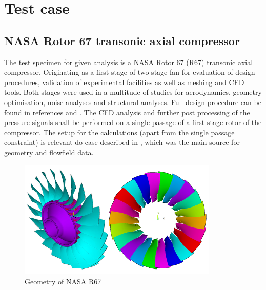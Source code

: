 
\chapter{Test case} %

\label{case} %


\section{NASA Rotor 67 transonic axial compressor}

The test specimen for given analysis is a NASA Rotor 67 (R67) transonic axial compressor. Originating as a first stage of two stage fan for evaluation of design procedures, validation of experimental facilities as well as meshing and CFD tools. Both stages were used in a multitude of studies for aerodynamics, geometry optimisation, noise analyses and structural analyses. Full design procedure can be found in references \cite{r67design} and \citep{r67performance}. The CFD analysis and further post processing of the pressure signals shall be performed on a single passage of a first stage rotor of the compressor. The setup for the  calculations (apart from the single passage constraint) is relevant do case described in \citep{r67laser}, which was the main source for geometry and flowfield data.

\begin{figure}[h!]
\centering %
\includegraphics[width=0.85\textwidth]{Pictures/r67_over.png}
\caption{Geometry of NASA R67}
\label{r67over}
\end{figure}

